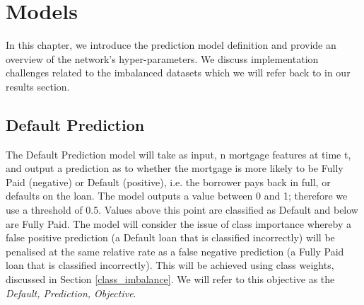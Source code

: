 \chapter{Models} \label{6: models}
    In this chapter, we introduce the prediction model definition and provide an overview of the network's hyper-parameters. We discuss implementation challenges related to the imbalanced datasets which we will refer back to in our results section. 
    
    \section{Default Prediction} \label{default_prediction}
        The Default Prediction model will take as input, n mortgage features at time t, and output a prediction as to whether the mortgage is more likely to be Fully Paid (negative) or Default (positive), i.e. the borrower pays back in full, or defaults on the loan. The model outputs a value between 0 and 1; therefore we use a threshold of 0.5. Values above this point are classified as Default and below are Fully Paid. The model will consider the issue of class importance whereby a false positive prediction (a Default loan that is classified incorrectly) will be penalised at the same relative rate as a false negative prediction (a Fully Paid loan that is classified incorrectly). This will be achieved using class weights, discussed in Section \ref{class_imbalance}. We will refer to this objective as the \textit{Default, Prediction, Objective}.
        

